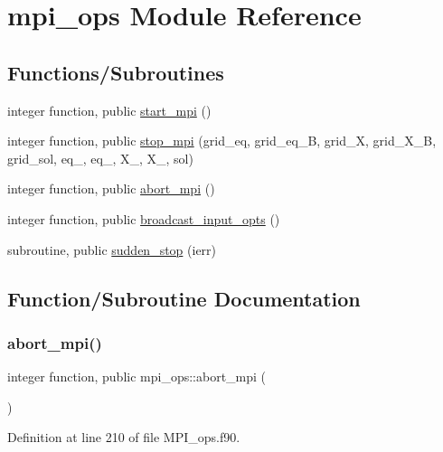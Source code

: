 \hypertarget{namespacempi__ops}{}\section{mpi\+\_\+ops Module Reference}
\label{namespacempi__ops}
\subsection*{Functions/\+Subroutines}
\begin{DoxyCompactItemize}
\item 
integer function, public \hyperlink{namespacempi__ops_a804ec65ff711509de1f8873f97bdf967}{start\+\_\+mpi} ()
\item 
integer function, public \hyperlink{namespacempi__ops_abaf1ff6b3a25463476a767e196b4a73c}{stop\+\_\+mpi} (grid\+\_\+eq, grid\+\_\+eq\+\_\+B, grid\+\_\+X, grid\+\_\+\+X\+\_\+B, grid\+\_\+sol, eq\+\_, eq\+\_, X\+\_, X\+\_, sol)
\item 
integer function, public \hyperlink{namespacempi__ops_a54d9258ef985728345579e8e57dc8dfe}{abort\+\_\+mpi} ()
\item 
integer function, public \hyperlink{namespacempi__ops_a932eba1c998dd7a0f1191b55cd754be3}{broadcast\+\_\+input\+\_\+opts} ()
\item 
subroutine, public \hyperlink{namespacempi__ops_a40e8610357a9a5b075fef9dab1c3f24f}{sudden\+\_\+stop} (ierr)
\end{DoxyCompactItemize}


\subsection{Function/\+Subroutine Documentation}
\mbox{\label{namespacempi__ops_a54d9258ef985728345579e8e57dc8dfe}} 
\subsubsection{\texorpdfstring{abort\+\_\+mpi()}{abort\_mpi()}}
{\footnotesize\ttfamily integer function, public mpi\+\_\+ops\+::abort\+\_\+mpi (\begin{DoxyParamCaption}{ }\end{DoxyParamCaption})}



Definition at line 210 of file M\+P\+I\+\_\+ops.\+f90.

